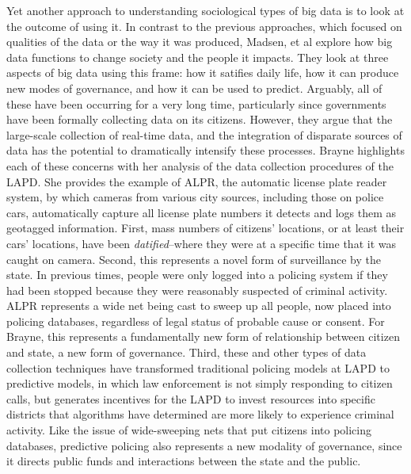 \documentclass[sigconf]{acmart}
\begin{document}
Yet another approach to understanding sociological types of big data is to look at the outcome of using it.  In contrast to the previous approaches, which focused on qualities of the data or the way it was produced, Madsen, et al explore how big data functions to change society and the people it impacts.\cite{madsen16}  They look at three aspects of big data using this frame: how it satifies daily life, how it can produce new modes of governance, and how it can be used to predict.  Arguably, all of these have been occurring for a very long time, particularly since governments have been formally collecting data on its citizens.  However, they argue that the large-scale collection of real-time data, and the integration of disparate sources of data has the potential to dramatically intensify these processes.  Brayne highlights each of these concerns with her analysis of the data collection procedures of the LAPD.\cite {brayne17}  She provides the example of ALPR, the automatic license plate reader system, by which cameras from various city sources, including those on police cars, automatically capture all license plate numbers it detects and logs them as geotagged information.   First, mass numbers of citizens' locations, or at least their cars' locations, have been {\em datified}--where they were at a specific time that it was caught on camera.  Second, this represents a novel form of surveillance by the state.  In previous times, people were only logged into a policing system if they had been stopped because they were reasonably suspected of criminal activity.  ALPR represents a wide net being cast to sweep up all people, now placed into policing databases, regardless of legal status of probable cause or consent.  For Brayne, this represents a fundamentally new form of relationship between citizen and state, a new form of governance.  Third, these and other types of data collection techniques have transformed traditional policing models at LAPD to predictive models, in which law enforcement is not simply responding to citizen calls, but generates incentives for the LAPD to invest resources into specific districts that algorithms have determined are more likely to experience criminal activity.  Like the issue of wide-sweeping nets that put citizens into policing databases, predictive policing also represents a new modality of governance, since it directs public funds and interactions between the state and the public.
\end{document}
